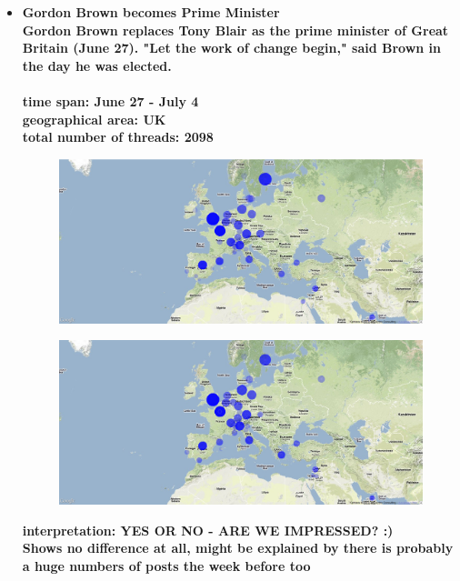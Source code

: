 \documentclass[11pt,a4paper,english]{article}
\begin{document}
				\begin{itemize}
					\item \bf Gordon Brown becomes Prime Minister \rm
						\\ Gordon Brown replaces Tony Blair as the prime minister of Great Britain (June 27). "Let the work of change begin," said Brown in the day he was elected.
						\\\\ \bf time span: \rm June 27 - July 4
						\\ \bf geographical area: \rm UK
						\\ \bf total number of threads: \rm 2098
						\begin{figure}[H]
							\vspace{-13pt}
  							\begin{center}
								\includegraphics[width=130mm]{img/pre-gordon}
							\end{center}
							\vspace{-13pt}
						\end{figure}
						\begin{figure}[H]
							\vspace{-13pt}
	  						\begin{center}
									\includegraphics[width=130mm]{img/post-gordon}
							\end{center}
							\vspace{-13pt}
						\end{figure}	
						\bf interpretation: \rm YES OR NO - ARE WE IMPRESSED? :)
						\\ Shows no difference at all, might be explained by there is probably a huge numbers of posts the week before too
						

\end{itemize}
\end{document}
